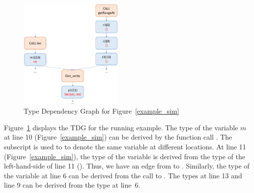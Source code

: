 

\begin{figure}[t]
	\begin{center}
	  \includegraphics[width=2in]{figures/type-dep-graph-2}
          \vspace{-8pt}
		\caption{Type Dependency Graph for Figure~\ref{example_sim}}
		\label{tdg}
	\end{center}
\end{figure}

Figure~\ref{tdg} displays the TDG for the running example. The
type of the variable $m$ at line 10 (Figure~\ref{example_sim}) can be
derived by the function call . The subscript is used to to
denote the same variable at different locations. At line 11
(Figure~\ref{example_sim}), the type of the variable  is
derived from the type of the left-hand-side of line 11
(). Thus, we have an edge from  to
. Similarly, the type of the variable  at line 6 can
be derived from the call to . The types at line 13
and line 9 can be derived from the type at line~6.
